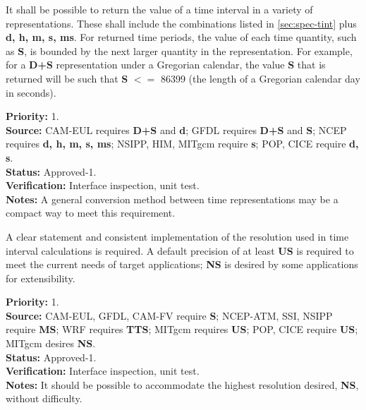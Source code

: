 \label{sec:query-tinterval}
It shall be possible to return the value of a time interval in a variety of 
representations.  These shall include the combinations listed in \ref{sec:spec-tint}
plus {\bf d, h, m, s, ms}. For returned time periods, the value of each time quantity, 
such as {\bf S}, is bounded by the next larger quantity in the representation.  For 
example, for a {\bf D+S} representation under a Gregorian calendar, the value {\bf S} that is 
returned will be such that {\bf S} $<=$ 86399 (the length of a Gregorian calendar day in
seconds).
\begin{reqlist}
{\bf Priority:} 1. \\
{\bf Source:} CAM-EUL requires {\bf D+S} and {\bf d}; 
GFDL requires {\bf D+S} and {\bf S};
NCEP requires {\bf d, h, m, s, ms};
NSIPP, HIM, MITgcm require {\bf s};
POP, CICE require {\bf d, s}. \\
{\bf Status:} Approved-1. \\
{\bf Verification:} Interface inspection, unit test. \\
{\bf Notes:} A general conversion method between time representations may be a compact 
way to meet this requirement.
\end{reqlist}

A clear statement and consistent implementation of the resolution used in time interval
calculations is required.  A default precision of at least {\bf US} is required to meet the
current needs of target applications; {\bf NS} is desired by some applications for extensibility.
\begin{reqlist}
{\bf Priority:} 1. \\
{\bf Source:} CAM-EUL, GFDL, CAM-FV require {\bf S};  
NCEP-ATM, SSI, NSIPP require {\bf MS}; 
WRF requires {\bf TTS}; 
MITgcm requires {\bf US}; 
POP, CICE require {\bf US}; 
MITgcm desires {\bf NS}. \\
{\bf Status:} Approved-1. \\
{\bf Verification:} Interface inspection, unit test. \\
{\bf Notes:}  It should be possible to accommodate the highest resolution desired, {\bf NS},
without difficulty.  
\end{reqlist}

